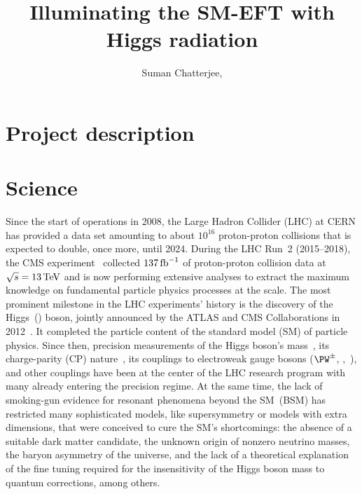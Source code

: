 \documentclass[a4paper,11pt]{article}
\begin{document}
\title{Illuminating the SM-EFT with Higgs radiation}

\author[a]{Suman Chatterjee,}



\section*{Project description}

\tableofcontents

\newpage

\section{Science}\label{sec:sciience}

Since the start of operations in 2008, the Large Hadron Collider (LHC) at CERN has provided a data set amounting to about $10^{16}$ proton-proton collisions that is expected to double, once more, until 2024.
During the LHC Run~2 (2015--2018), the CMS experiment~\cite{CMS_ex} collected  $137\mbox{\ensuremath{\,\text{fb}^{-1}}}$ of proton-proton collision data at $\sqrt{s}=13\,\text{Te\hspace{-.08em}V}$ and is now performing extensive analyses to extract the maximum knowledge on fundamental particle physics processes at the \TeV scale.
The most prominent milestone in the LHC experiments' history is the discovery of the Higgs~(\PH) boson, jointly announced by the ATLAS and CMS Collaborations in 2012~\cite{Aad:2012tfa,Chatrchyan:2012ufa}.
It completed the particle content of the standard model (SM) of particle physics. 
Since then, precision measurements of the Higgs boson's mass~\cite{CMS:2017dib,CMS:2020xrn}, its charge-parity (CP) nature~\cite{CMS:2019jdw,CMS:2020cga}, its couplings to electroweak gauge bosons ($\PW^{\pm}$, \PZ,~\Pgg), and other couplings have been at the center of the LHC research program with many already entering the precision regime.
At the same time, the lack of smoking-gun evidence for resonant phenomena beyond the SM~(BSM) has restricted many sophisticated models, like supersymmetry or models with extra dimensions, that were conceived to cure the SM's shortcomings: 
the absence of a suitable dark matter candidate, the unknown origin of nonzero neutrino masses, the baryon asymmetry of the universe, and the lack of a theoretical explanation of the fine tuning required for the insensitivity of the Higgs boson mass to quantum corrections, among others. 
\end{document}

